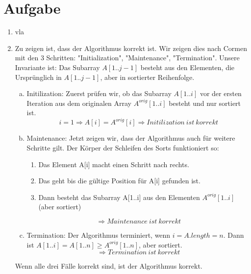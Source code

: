 \documentclass[a4paper,fleqn]{scrartcl}
\begin{document}
\section{Aufgabe}
\begin{enumerate}[1.]
\item vla
\item Zu zeigen ist, dass der Algorithmus korrekt ist. Wir zeigen dies nach
Cormen mit den 3 Schritten: "Initialization", "Maintenance", "Termination".
Unsere Invariante ist: Das Subarray \(A[1..j-1]\) besteht aus den Elementen, die
Ursprünglich in \(A[1..j-1]\), aber in sortierter Reihenfolge.
\begin{enumerate}[(a)]
\item Initilization: Zuerst prüfen wir, ob das Subarray \(A[1..i]\) vor der
ersten Iteration aus dem originalen Array \(A^{orig}[1..i]\) besteht und
nur sortiert ist.
\[i = 1 \Rightarrow A[i] = A^{orig}[i] \Rightarrow Initilization\ ist\ korrekt\]
\item Maintenance: Jetzt zeigen wir, dass der Algorithmus auch für weitere Schritte gilt.
Der Körper der Schleifen des Sorts funktioniert so:
\begin{enumerate}
\item Das Element A[i] macht einen Schritt nach rechts.
\item Das geht bis die gültige Position für A[i] gefunden ist.
\item Dann besteht das Subarray A[1..i] aus den Elementen \(A^{orig}[1..i]\) (aber sortiert)
\end{enumerate}
\[\Rightarrow Maintenance\ ist\ korrekt\]
\item Termination: Der Algorithmus terminiert, wenn \(i=A.length = n\).
Dann ist \(A[1..i] = A[1..n] \geq A^{orig}[1..n]\), aber sortiert.
\[\Rightarrow Termination\ ist\ korrekt\]
\end{enumerate}
Wenn alle drei Fälle korrekt sind, ist der Algorithmus korrekt.

\end{enumerate}
\end{document}
